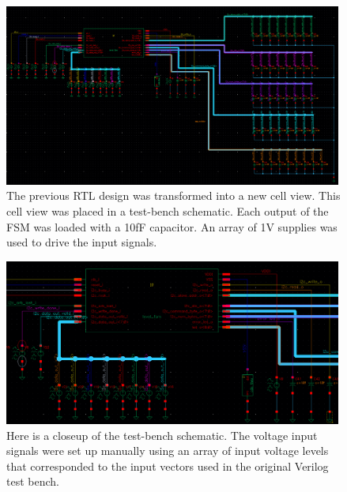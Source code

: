 \documentclass[11pt]{article}
\begin{document}
\begin{figure}[H]
    \centering
\includegraphics[width=0.99\textwidth]{schem2.png}
    \caption{The previous RTL design was transformed into a new cell view. This cell view was placed in a test-bench schematic. Each output of the FSM was loaded with a 10fF capacitor. An array of 1V supplies was used to drive the input signals.}
\end{figure}


\begin{figure}[H]
    \centering
\includegraphics[width=0.99\textwidth]{closeup1.png}
    \caption{Here is a closeup of the test-bench schematic. The voltage input signals were set up manually using an array of input voltage levels that corresponded to the input vectors used in the original Verilog test bench.}
\end{figure}
\end{document}
